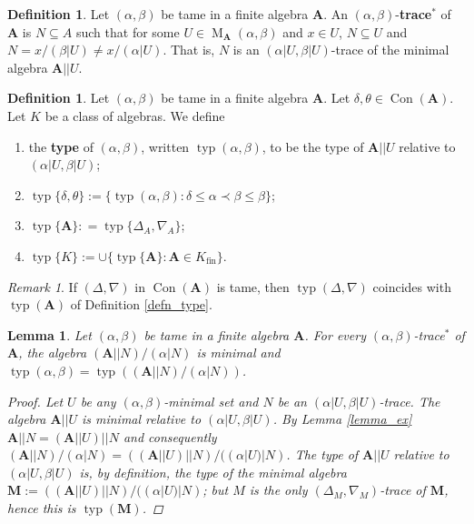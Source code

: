 \documentclass{amsart}
\theoremstyle{plain}
\newtheorem{lemma}[theorem]{Lemma}
\theoremstyle{definition}
\newtheorem{definition}[theorem]{Definition}
\theoremstyle{remark}
\newtheorem{remark}[theorem]{Remark}
\DeclareMathOperator{\Con}{Con}
\DeclareMathOperator{\typ}{typ}
\DeclareMathOperator{\M}{M}
\DeclareMathOperator{\fin}{fin}
\begin{document}
\begin{definition}
    Let $(\alpha, \beta)$ be tame in a finite algebra $\mathbf{A}$. 
    An $(\alpha, \beta)$-\textbf{trace$^*$} of $\mathbf{A}$ is 
    $N \subseteq A$ such that for some $U \in \M_{\mathbf{A}}(\alpha, \beta)$ and $x \in U$, $N\subseteq U$ and $N=x/(\beta|U) \neq x/(\alpha|U)$. 
    That is, $N$ is an $(\alpha|U, \beta|U)$-trace of the minimal algebra $\mathbf{A}||U$. 
\end{definition}

\begin{definition}
    Let $(\alpha, \beta)$ be tame in a finite algebra $\mathbf{A}$.
    Let $\delta, \theta \in \Con(\mathbf{A})$. 
    Let $K$ be a class of algebras. 
    We define 
    \begin{enumerate}
        \item the \textbf{type} of $(\alpha, \beta)$, written $\typ(\alpha, \beta)$, to be the type of
        $\mathbf{A}||U$ relative to $(\alpha|U, \beta|U)$;
        \item $\typ\{\delta, \theta\} :=\{ \typ(\alpha, \beta) : \delta \le \alpha \prec \beta \le \beta\}$;
        \item $\typ\{\mathbf{A}\}: =\typ\{\Delta_A, \nabla_A\}$; 
        \item $\typ\{K\}:=\cup\{\typ\{\mathbf{A}\} : \mathbf{A} \in K_{\fin}\}$. 
    \end{enumerate}
\end{definition}

\begin{remark}
    If $(\Delta, \nabla)$ in $\Con(\mathbf{A})$ is tame, then $\typ(\Delta, \nabla)$ coincides with $\typ(\mathbf{A})$ of Definition \ref{defn_type}. 
\end{remark}

\begin{lemma}
    Let $(\alpha, \beta)$ be tame in a finite algebra $\mathbf{A}$.
    For every $(\alpha, \beta)$-trace$^*$ of $\mathbf{A}$, the algebra $(\mathbf{A}||N)/(\alpha|N)$ is minimal and $\typ(\alpha, \beta) = \typ((\mathbf{A}||N)/(\alpha|N))$. 
    \begin{proof}
        Let $U$ be any $(\alpha, \beta)$-minimal set and $N$ be an $(\alpha|U, \beta|U)$-trace. 
        The algebra $\mathbf{A}||U$ is minimal relative to $(\alpha|U, \beta|U)$. 
        By Lemma \ref{lemma_ex} $\mathbf{A}||N = (\mathbf{A}||U)||N$ and consequently $(\mathbf{A}||N)/(\alpha|N) = ((\mathbf{A}||U)||N)/((\alpha|U)|N)$. 
        The type of $\mathbf{A}||U$ relative to $(\alpha|U, \beta|U)$ is, by definition, the type of the minimal algebra $\mathbf{M}:= ((\mathbf{A}||U)||N)/((\alpha|U)|N)$; 
        but $M$ is the only $(\Delta_M, \nabla_M)$-trace of $\mathbf{M}$, hence this is $\typ(\mathbf{M})$. 

    \end{proof}
\end{lemma}
\end{document}
